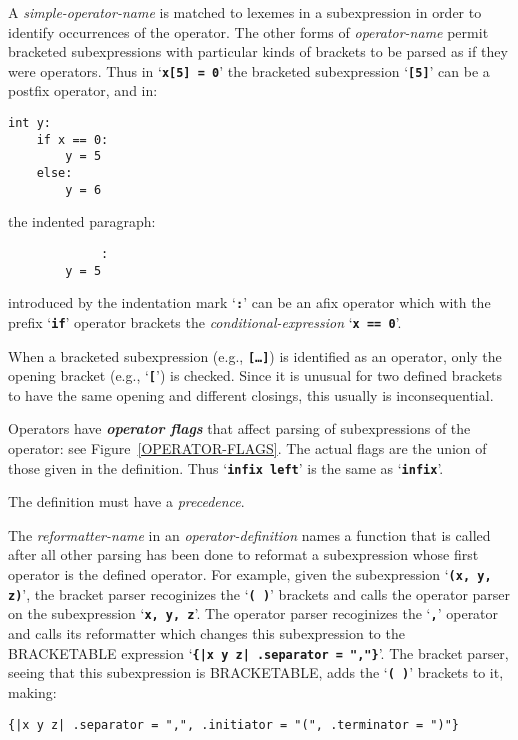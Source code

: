 \documentclass[12pt]{article}
\newcommand{\TT}[1]{{\tt \bfseries #1}}
\newcommand{\skey}[2]{{\bf \em #1#2}\index{#1}}
\newenvironment{indpar}[1][0.3in]%
	{\begin{list}{}%
		     {\setlength{\itemsep}{0in}%
		      \setlength{\topsep}{0in}%
		      \setlength{\parsep}{1ex}%
		      \setlength{\labelwidth}{#1}%
		      \setlength{\leftmargin}{#1}%
		      \addtolength{\leftmargin}{\labelsep}}%
	 \item}%
	{\end{list}}
\begin{document}
A {\em simple-operator-name} is matched to lexemes in a subexpression
in order to identify occurrences of the operator.
The other forms of {\em operator-name} permit bracketed subexpressions
with particular kinds of brackets to be parsed as if they were operators.
Thus in `\TT{x[5] = 0}' the bracketed subexpression
`\TT{[5]}' can be a postfix operator, and in:
\begin{indpar}\begin{verbatim}
int y:
    if x == 0:
        y = 5
    else:
        y = 6
\end{verbatim}\end{indpar}
the indented paragraph:
\begin{indpar}\begin{verbatim}
             :
        y = 5
\end{verbatim}\end{indpar}
introduced by the indentation mark `\TT{:}'
can be an afix operator which with the prefix `\TT{if}' operator
brackets the {\em conditional-expression} `\TT{x == 0}'.

When a bracketed subexpression (e.g., \TT{[\ldots]}) is identified as
an operator, only the opening bracket (e.g., `\TT{[}') is checked.
Since it is unusual for two defined brackets to have the same opening
and different closings, this usually is inconsequential.

Operators have \skey{operator flag}s that
affect parsing of subexpressions of the operator:
see Figure~\ref{OPERATOR-FLAGS}.
The actual flags are the union of those given in the definition.
Thus `\TT{infix left}' is the same as `\TT{infix}'.

The definition must have a {\em precedence}.

The {\em reformatter-name} in an {\em operator-definition} names a
function that is called after all other parsing has been done to
reformat a subexpression whose first operator is the defined operator.
For example, given the subexpression `\TT{(x, y, z)}', the bracket
parser recoginizes the `\TT{(~)}' brackets and calls the operator
parser on the subexpression `\TT{x, y, z}'.  The operator parser
recoginizes the `\TT{,}' operator and calls its reformatter
which changes this subexpression to the BRACKETABLE
expression `\TT{\{|x y z| .separator = ","\}}'.  The bracket parser,
seeing that this subexpression is BRACKETABLE, adds the `\TT{(~)}'
brackets to it, making: \\
\centerline{\tt \{|x y z| .separator = ",",
                          .initiator = "(",
			  .terminator = ")"\}}
\end{document}
